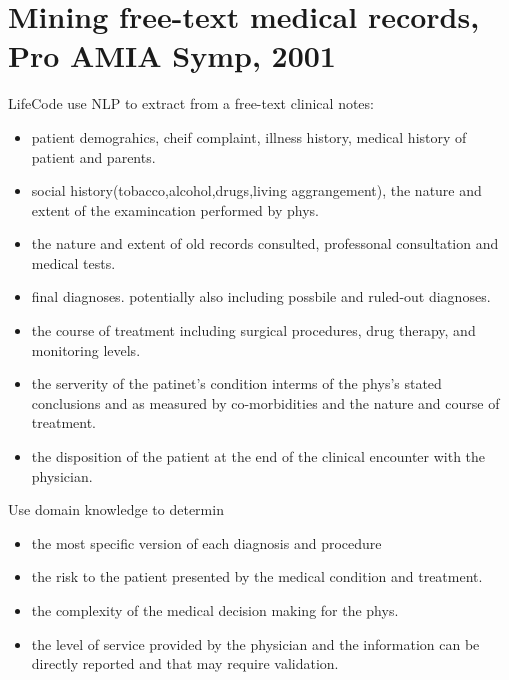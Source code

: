 \documentclass[pdftext,twoside,11pt]{article}
\begin{document}
\section{Mining free-text medical records, Pro AMIA Symp, 2001}
\label{sec:intro} 
LifeCode use NLP to extract from a free-text clinical notes:
\begin{itemize}
\item patient demograhics, cheif complaint, illness history, medical history of patient and parents.
\item social history(tobacco,alcohol,drugs,living aggrangement), the nature and extent of the examincation performed by phys.
\item the nature and extent of old records consulted, professonal consultation and medical tests.
\item final diagnoses. potentially also including possbile and ruled-out diagnoses. 
\item the course of treatment including surgical procedures, drug therapy, and monitoring levels. 
\item the serverity of the patinet's condition interms of the phys's stated conclusions and as measured by co-morbidities and the nature and course of treatment.
\item the disposition of the patient at the end of the clinical encounter with the physician.
\end{itemize}
Use domain knowledge to determin
\begin{itemize}
\item the most specific version of each diagnosis and procedure
\item the risk to the patient presented by the medical condition and treatment.
\item the complexity of the medical decision making for the phys.
\item the level of service provided by the physician and the information can be directly reported and that may require validation.
\end{itemize}
\end{document}
